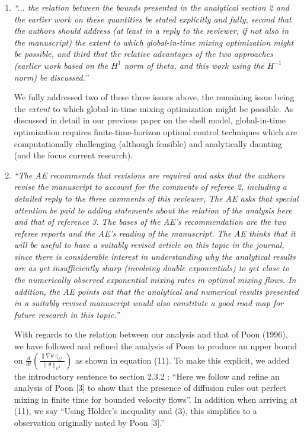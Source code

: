 \documentclass[]{article}
\newcommand{\ltwo}[1]{\|#1\|_{L^{2}}}
\newcommand{\hone}[1]{\| \nabla #1\|_{L^{2}}}
\begin{document}
\begin{enumerate}
\item {\it ``... the relation between the bounds presented in the analytical section 2 and the earlier work on these quantities be stated explicitly and fully, second that the authors should address (at least in a reply to the reviewer, if not also in the manuscript) the extent to which global-in-time mixing optimization might be possible, and third that the relative advantages of the two approaches (earlier work based on the $H^1$ norm of theta, and this work using the $H^{-1}$ norm) be discussed.''}

We fully addressed two of these three issues above, the remaining issue being the {\it extent} to which global-in-time mixing optimization might be possible. As discussed in detail in our previous paper on the shell model, global-in-time optimization requires finite-time-horizon optimal control techniques which are computationally challenging (although feasible) and analytically daunting (and the focus current research). 


\item {\it ``The AE recommends that revisions are required and asks that the authors revise the manuscript to account for the comments of referee 2, including a detailed reply to the three comments of this reviewer, The AE asks that special attention be paid to adding statements about the relation of the analysis here and that of reference 3. The bases of the AE's recommendation are the two referee reports and the AE's reading of the manuscript. The AE thinks that it will be useful to have a suitably revised article on this topic in the journal, since there is considerable interest in understanding why the analytical results are as yet insufficiently sharp (involving double exponentials) to get close to the numerically observed exponential mixing rates in optimal mixing flows. In addition, the AE points out that the analytical and numerical results presented in a suitably revised manuscript would also constitute a good road map for future research in this topic.'' }

With regards to the relation between our analysis and that of Poon (1996), we have followed and refined the analysis of Poon to produce an upper bound on $\frac{d}{dt} \left(\frac{\hone{\theta}}{\ltwo{\theta}}\right)$ as shown in equation (11). To make this explicit, we added the introductory sentence to section 2.3.2 : ``Here we follow and refine an analysis of Poon [3] to show that the presence of diffusion rules out perfect mixing in finite time for bounded velocity flows''. In addition when arriving at (11), we say ``Using H\"older's inequality and (3), this simplifies to a observation originally noted by Poon [3].''


\end{enumerate}
\end{document}
